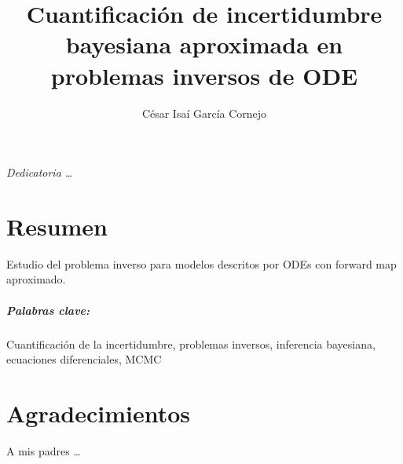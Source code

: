 \documentclass[letterpaper,12pt,twoside]{book}  %
\author{César Isaí García Cornejo}
\title{Cuantificación de incertidumbre bayesiana aproximada en problemas inversos de ODE}
\begin{document}
\maketitle  %

\thispagestyle{empty}  %

\frontmatter

\chapter*{}
\begin{flushright}%
  \emph{Dedicatoria \ldots}
  \thispagestyle{empty}
\end{flushright}

\chapter*{Resumen}

Estudio del problema inverso para modelos descritos por ODEs con forward map aproximado.
\\
\paragraph{Palabras clave:} Cuantificación de la incertidumbre, problemas inversos, inferencia bayesiana, ecuaciones diferenciales, MCMC

\chapter*{Agradecimientos}

A mis padres \ldots

\tableofcontents

\listoffigures

\mainmatter















\appendix


\backmatter
\end{document}
